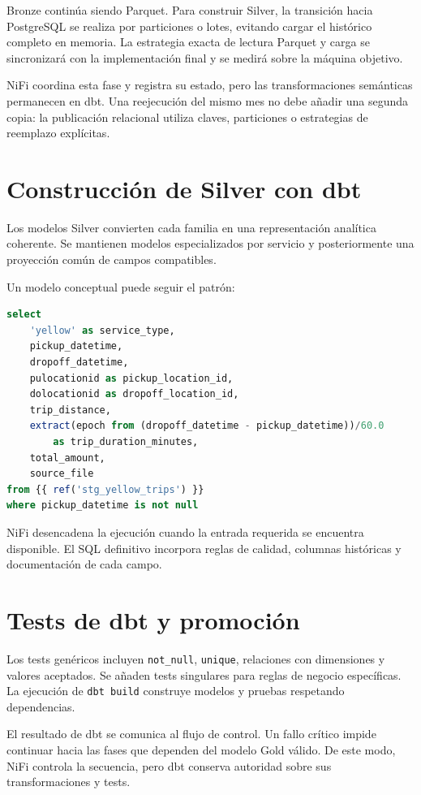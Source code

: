 Bronze continúa siendo Parquet. Para construir Silver, la transición hacia PostgreSQL se realiza por particiones o lotes, evitando cargar el histórico completo en memoria. La estrategia exacta de lectura Parquet y carga se sincronizará con la implementación final y se medirá sobre la máquina objetivo.

NiFi coordina esta fase y registra su estado, pero las transformaciones semánticas permanecen en dbt. Una reejecución del mismo mes no debe añadir una segunda copia: la publicación relacional utiliza claves, particiones o estrategias de reemplazo explícitas.

\section{Construcción de Silver con dbt}

Los modelos Silver convierten cada familia en una representación analítica coherente. Se mantienen modelos especializados por servicio y posteriormente una proyección común de campos compatibles.

Un modelo conceptual puede seguir el patrón:

\begin{lstlisting}[language=SQL,caption={Esquema conceptual simplificado de una transformación Silver.}]
select
    'yellow' as service_type,
    pickup_datetime,
    dropoff_datetime,
    pulocationid as pickup_location_id,
    dolocationid as dropoff_location_id,
    trip_distance,
    extract(epoch from (dropoff_datetime - pickup_datetime))/60.0
        as trip_duration_minutes,
    total_amount,
    source_file
from {{ ref('stg_yellow_trips') }}
where pickup_datetime is not null
\end{lstlisting}

NiFi desencadena la ejecución cuando la entrada requerida se encuentra disponible. El SQL definitivo incorpora reglas de calidad, columnas históricas y documentación de cada campo.

\section{Tests de dbt y promoción}

Los tests genéricos incluyen \texttt{not\_null}, \texttt{unique}, relaciones con dimensiones y valores aceptados. Se añaden tests singulares para reglas de negocio específicas. La ejecución de \texttt{dbt build} construye modelos y pruebas respetando dependencias.

El resultado de dbt se comunica al flujo de control. Un fallo crítico impide continuar hacia las fases que dependen del modelo Gold válido. De este modo, NiFi controla la secuencia, pero dbt conserva autoridad sobre sus transformaciones y tests.

